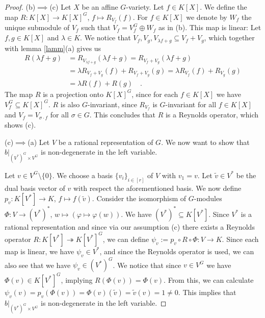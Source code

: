 \begin{proof}
  (b)$\implies$(c) \; Let $X$ be an affine $G$-variety.
  Let $f \in K[X]$.
  We define the map \linebreak$R \colon K[X] \rightarrow K[X]^G $, $ f \mapsto R_{V_f}(f)$. %
  For $f \in K[X]$ we denote by $W_f$ the unique submodule of $V_f$ such that $V_f = V_f^G \oplus W_f$ as in (b). %
  This map is linear:
  Let $f,g \in K[X]$ and $\lambda \in K$.
  We notice that $V_f,V_g,V_{\lambda f + g} \subseteq V_f + V_g$, which together with lemma \ref{lamm}(a) gives us %
  \begin{equation*}
    \begin{aligned}
      R(\lambda f +g)
      &= R_{V_{\lambda f +g}}(\lambda f+g)  
      = R_{V_f +V_g}(\lambda f+g)  \\
      &= \lambda R_{V_f + V_g} (f) + R_{V_f + V_g}(g)  
      = \lambda R_{V_f} (f) + R_{V_g}(g)\\
      &= \lambda R(f) + R(g) \quad .
    \end{aligned}
  \end{equation*}
  The map $R$ is a projection onto $K[X]^G$, since for each $f \in K[X]$ we have $V_f^G \subseteq K[X]^G$. %
  $R$ is also $G$-invariant, since $R_{V_f}$ is $G$-invariant for all $f \in K[X]$ and  $V_f = V_{\sigma\cdot f}$ for all $\sigma \in G$.
  This concludes that $R$ is a Reynolds operator, which shows (c).
  
  (c)$\implies$(a) \; Let $V$ be a rational representation of $G$.
  We now want to show that $\left. b\right|_{(V^\ast)^G \times V^G}$ is non-degenerate in the left variable.
  
  Let $v \in V^G \setminus \{0\}$.
  We choose a basis $\{v_i\}_{i\in [r]}$ of $V$ with $v_1 = v$.
  Let $\tilde{v} \in V^\ast$ be the dual basis vector of $v$ with respect the aforementioned basis.
  We now define $p_v \colon K[V^\ast] \rightarrow K$, $f \mapsto f(\tilde{v})$.
  Consider the isomorphism of $G$-modules $\Phi \colon V \rightarrow (V^\ast)^\ast$, $w \mapsto (\varphi \mapsto \varphi (w))$.
  We have $(V^\ast)^\ast \subseteq K[V^\ast]$.
  Since $V^\ast$ is a rational representation and since via our assumption (c) there exists a Reynolds operator $R \colon K[V^\ast] \twoheadrightarrow K[V^\ast]^G$, we can define $ \psi_v := p_v \circ R \circ \Phi \colon V \rightarrow K$.
  Since each map is linear, we have $\psi_v \in V^\ast$, and since the Reynolds operator is used, we can also see that we have $\psi_v \in (V^\ast)^G$.
  We notice that since $v \in V^G$ we have $\Phi (v) \in K[V^\ast]^G$, implying $R(\Phi(v))=\Phi(v)$.
  From this, we can calculate $\psi_v (v) = p_v (\Phi(v)) = \Phi (v) (\tilde{v}) = \tilde{v} (v) = 1 \neq 0$.
  This implies that $\left. b\right|_{(V^\ast)^G \times V^G}$ is non-degenerate in the left variable.
  

\end{proof}
